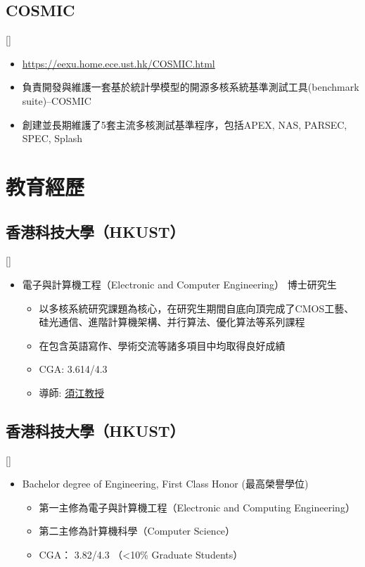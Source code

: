 \documentclass{mycv}
\begin{document}
\subsection{COSMIC}[]
\begin{positions}
\end{positions}

\begin{itemize}
	\item \url{https://eexu.home.ece.ust.hk/COSMIC.html}
	\item 負責開發與維護一套基於統計學模型的開源多核系統基準測試工具(benchmark suite)--COSMIC
	\item 創建並長期維護了5套主流多核測試基準程序，包括APEX, NAS, PARSEC, SPEC, Splash
\end{itemize}

\section{教育經歷}

\subsection{香港科技大學（HKUST）}[]
\vspace{-\parskip}%
\begin{itemize}[label={}]
	\item 電子與計算機工程（Electronic and Computer Engineering） 博士研究生 
	\begin{itemize}[label=\textbullet]
		\item 以多核系統研究課題為核心，在研究生期間自底向頂完成了CMOS工藝、硅光通信、進階計算機架構、并行算法、優化算法等系列課程
		\item 在包含英語寫作、學術交流等諸多項目中均取得良好成績
		\item CGA: 3.614/4.3
		\item 導師: \href{https://eexu.home.ece.ust.hk/}{須江教授}
	\end{itemize}
\end{itemize}

\subsection{香港科技大學（HKUST）}[]
\vspace{-\parskip}%
\begin{itemize}[label={}]
	\item Bachelor degree of Engineering, First Class Honor (最高榮譽學位)
	\begin{itemize}[label=\textbullet]
      \item 第一主修為電子與計算機工程（Electronic and Computing Engineering）
      \item 第二主修為計算機科學（Computer Science）
      \item CGA： 3.82/4.3 （<10\% Graduate Students）
	\end{itemize}
\end{itemize}
\end{document}
